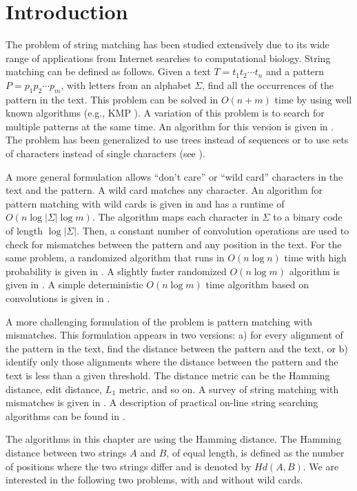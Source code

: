 \section{Introduction}

The problem of string matching has been studied extensively
due to its wide range of applications from Internet searches to computational biology. 
String matching can be defined as follows. Given a text $T=t_1 t_2\cdots
t_n$ and a pattern $P=p_1p_2\cdots p_m$, with letters from an alphabet $\Sigma$,
find all the occurrences of the pattern in the text.
This problem can be solved in $O(n+m)$ time by using well known algorithms
(e.g., KMP \cite{KMP77}). A variation of this problem is to search for
multiple patterns at the same time. An algorithm for this version is given in 
\cite{AC75}. The problem has been generalized to use trees instead of sequences
or to use sets of characters instead of single characters (see \cite{CH99}). 


A more general formulation allows ``don't care'' or ``wild card''
characters in the text and the pattern. A wild card matches any character. An 
algorithm for pattern matching with wild cards is given in \cite{FP74} and has a
runtime of $O(n \log |\Sigma| \log m)$.  The algorithm maps each character in
$\Sigma$ to a binary code of length $\log |\Sigma|$. Then, a constant number of
convolution operations are used to check for mismatches between the
pattern and any position in the text. For the same problem, a randomized algorithm
that runs in $O(n \log n)$ time with high probability is given
in \cite{IND98}. A slightly faster randomized $O(n \log m)$ algorithm is given in
\cite{Kal02}. A simple deterministic $O(n \log m)$ time algorithm based on
convolutions is given in \cite{CC07}.

A more challenging formulation of the problem is pattern matching with
mismatches.
This formulation appears in two versions: a) for every alignment of the
pattern in the text, find the distance between the pattern and the text,
or b) identify only those alignments where the distance between the pattern and the text is less than a given
threshold. The distance metric can be the Hamming distance, edit
distance, $L_1$ metric, and so on. 
A survey of string matching with mismatches is given in \cite{Nav01}.
A description of practical on-line string searching algorithms can be
found in \cite{NR02}.

The algorithms in this chapter are using
the Hamming distance. The Hamming distance between two strings $A$ and $B$, of equal
length, is defined as the number of positions where the two strings differ and is denoted
by $Hd(A,B)$. We are interested in the following two problems, with and without
wild cards.
 

